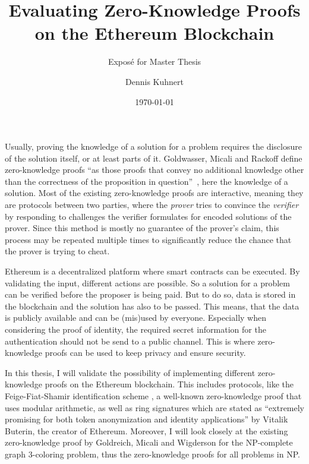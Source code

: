 \documentclass[a4paper,parskip=half]{scrartcl}
\title{Evaluating Zero-Knowledge Proofs on the Ethereum Blockchain\todo{determine title of thesis}}
\subtitle{Exposé for Master Thesis}
\author{Dennis Kuhnert}
\date{\today}
\begin{document}
\maketitle

Usually, proving the knowledge of a solution for a problem requires the disclosure of the solution itself, or at least parts of it.
Goldwasser, Micali and Rackoff define zero-knowledge proofs ``as those proofs that convey no additional knowledge other than the correctness of the proposition in question''~\cite{goldwasser1989knowledge}, here the knowledge of a solution.
Most of the existing zero-knowledge proofs are interactive, meaning they are protocols between two parties, where the \emph{prover} tries to convince the \emph{verifier} by responding to challenges the verifier formulates for encoded solutions of the prover.
Since this method is mostly no guarantee of the prover's claim, this process may be repeated multiple times to significantly reduce the chance that the prover is trying to cheat.

Ethereum is a decentralized platform where smart contracts can be executed.
By validating the input, different actions are possible.
So a solution for a problem can be verified before the proposer is being paid.
But to do so, data is stored in the blockchain and the solution has also to be passed.
This means, that the data is publicly available and can be (mis)used by everyone.
Especially when considering the proof of identity, the required secret information for the authentication should not be send to a public channel.
This is where zero-knowledge proofs can be used to keep privacy and ensure security.

In this thesis, I will validate the possibility of implementing different zero-knowledge proofs on the Ethereum blockchain.
This includes protocols, like the Feige-Fiat-Shamir identification scheme \cite{feige1988zero}, a well-known zero-knowledge proof that uses modular arithmetic, as well as 
ring signatures which are stated as ``extremely promising for both token anonymization and identity applications'' \cite{buterin2015public} by Vitalik Buterin, the creator of Ethereum.
Moreover, I will look closely at the existing zero-knowledge proof by Goldreich, Micali and Wigderson \cite{goldreich1991proofs} for the NP-complete graph 3-coloring problem, thus the zero-knowledge proofs for all problems in NP.
\end{document}
